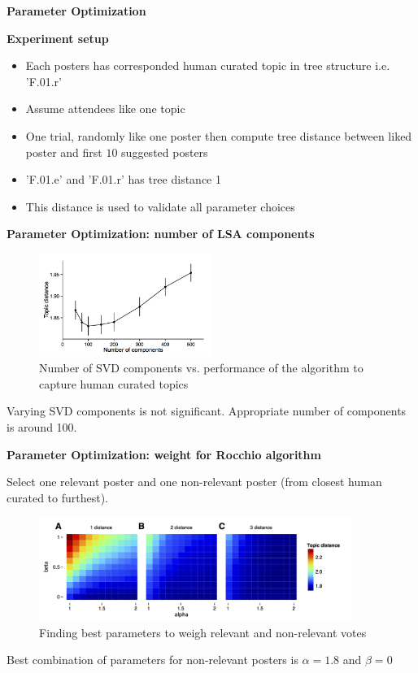 \begin{frame}{\textbf{Parameter Optimization}}

\textbf{Experiment setup}

\begin{itemize}
\item Each posters has corresponded human curated topic in tree structure i.e. 'F.01.r'
\item Assume attendees like one topic
\item One trial, randomly like one poster then compute tree distance between liked poster and first $10$ suggested posters 
\item 'F.01.e' and 'F.01.r' has tree distance 1
\item This distance is used to validate all parameter choices
\end{itemize}

\end{frame}



\begin{frame}{\textbf{Parameter Optimization: number of LSA components}}

\begin{figure}
\includegraphics[width=2.2in]{images/performance_vs_components}\\
\tiny{Number of SVD components vs. performance of the algorithm to capture human curated topics}
\end{figure}

Varying SVD components is not significant. Appropriate number of components is around 100.

\end{frame}


\begin{frame}{\textbf{Parameter Optimization: weight for Rocchio algorithm}}

Select one relevant poster and one non-relevant poster (from closest human curated to furthest).

\begin{figure}
\includegraphics[width=4.0in]{images/alpha_beta_relation_plot}\\
\tiny{Finding best parameters to weigh relevant and non-relevant votes}
\end{figure}

Best combination of parameters for non-relevant posters is $\alpha=1.8$ and $\beta=0$

\end{frame}


